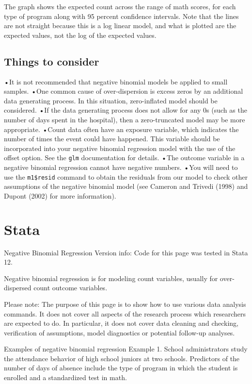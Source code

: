 The graph shows the expected count across the range of math scores, for each type of program along with 95 percent confidence intervals. Note that the lines are not straight because this is a log linear model, and what is plotted are the expected values, not the log of the expected values.

\subsection{Things to consider}
•It is not recommended that negative binomial models be applied to small samples. 
•One common cause of over-dispersion is excess zeros by an additional data generating process. In this situation, zero-inflated model should be considered.
•If the data generating process does not allow for any 0s (such as the number of days spent in the hospital), then a zero-truncated model may be more appropriate.
•Count data often have an exposure variable, which indicates the number of times the event could have happened. This variable should be incorporated into your negative binomial regression model with the use of the offset option. See the \texttt{glm} documentation for details.
•The outcome variable in a negative binomial regression cannot have negative numbers.
•You will need to use the \texttt{m1\$resid} command to obtain the residuals from our model to check other assumptions of the negative binomial model (see Cameron and Trivedi (1998) and Dupont (2002) for more information).


\section*{Stata}
Negative Binomial Regression
Version info: Code for this page was tested in Stata 12. 

Negative binomial regression is for modeling count variables, usually for over-dispersed count outcome variables.

Please note: The purpose of this page is to show how to use various data analysis commands.  It does not cover all aspects of the research process which researchers are expected to do.  In particular, it does not cover data cleaning and checking, verification of assumptions, model diagnostics or potential follow-up analyses. 

Examples of negative binomial regression
Example 1.  School administrators study the attendance behavior of high school juniors at two schools.  Predictors of the number of days of absence include the type of program in which the student is enrolled and a standardized test in math. 

